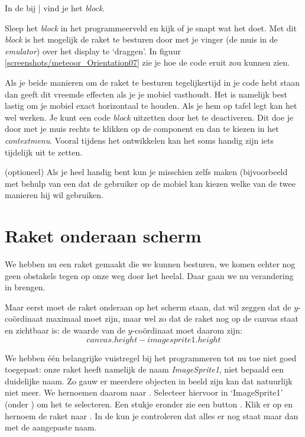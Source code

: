 In de  bij  |  vind je het  \emph{block}.

\begin{opgave}
    \opgVraag
  Sleep het  \emph{block} in het programmeerveld en kijk of je snapt wat het doet. Met dit \emph{block} is het mogelijk de raket te besturen door met je vinger (de muis in de \emph{emulator}) over het display te `draggen'. In figuur \ref{screenshots/meteoor_Orientation07} zie je hoe de code eruit zou kunnen zien.
\end{opgave}


Als je beide manieren om de raket te besturen tegelijkertijd in je code hebt staan dan geeft dit vreemde effecten als je je mobiel vasthoudt. Het is namelijk best lastig om je mobiel exact horizontaal te houden. Als je hem op tafel legt kan het wel werken. Je kunt een code \emph{block} uitzetten door het te deactiveren. Dit doe je door met je muis rechts te klikken op de component en dan  te kiezen in het \emph{contextmenu}. Vooral tijdens het ontwikkelen kan het soms handig zijn iets tijdelijk uit te zetten. 


\begin{opgave}
   \opgVraag (optioneel)
	Als je heel handig bent kun je misschien zelfs maken (bijvoorbeeld met behulp van een  dat de gebruiker op de mobiel 
	kan kiezen welke van de twee manieren hij wil gebruiken.
\end{opgave}


\section{Raket onderaan scherm}
We hebben nu een raket gemaakt die we kunnen besturen, we komen echter nog geen obstakels tegen op onze weg door het heelal. Daar gaan we nu verandering in brengen. 

Maar eerst moet de raket onderaan op het scherm staan, dat wil zeggen dat de $y$-co\"ordinaat maximaal moet zijn, maar wel zo dat de raket nog op de canvas staat en zichtbaar is: de waarde van de $y$-co\"ordinaat moet daarom zijn:  
\[
	canvas.height - imagesprite1.height  
\]

We hebben \'e\'en belangrijke vuistregel bij het programmeren tot nu toe niet goed toegepast: onze raket heeft namelijk de naam \emph{ImageSprite1}, niet bepaald een duidelijke naam. Zo gauw er meerdere objecten in beeld zijn kan dat natuurlijk niet meer. We hernoemen daarom  naar . Selecteer hiervoor in \ai `ImageSprite1' (onder ) om het te selecteren. Een stukje eronder zie een button . Klik er op en hernoem de raket naar . In de  kun je controleren dat alles er nog staat maar dan met de aangepaste naam. 

